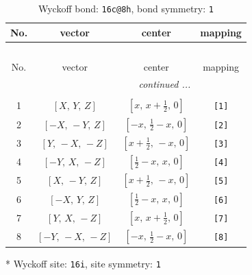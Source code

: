 \documentclass[fleqn,8pt]{jsarticle}
\begin{document}
\renewcommand{\arraystretch}{1.2}
\begin{longtable}{cccc}
\caption{Wyckoff bond: {\tt 16c@8h}, bond symmetry: {\tt 1}}
 \\
 \hline \hline
No. & vector & center & mapping \\ \hline \endfirsthead

\multicolumn{3}{l}{\tablename\ \thetable{}} \\
 \hline \hline
No. & vector & center & mapping \\ \hline \endhead

 \hline \hline
\multicolumn{3}{r}{\footnotesize\it continued ...} \\ \endfoot

 \hline \hline
\multicolumn{3}{r}{} \\ \endlastfoot

1 & $\left[ X,\, Y,\, Z \right]$ & $\left[ x,\, x + \frac{1}{2},\, 0 \right]$ & {\tt [1]} \\ \hline
2 & $\left[ - X,\, - Y,\, Z \right]$ & $\left[ - x,\, \frac{1}{2} - x,\, 0 \right]$ & {\tt [2]} \\ \hline
3 & $\left[ Y,\, - X,\, - Z \right]$ & $\left[ x + \frac{1}{2},\, - x,\, 0 \right]$ & {\tt [3]} \\ \hline
4 & $\left[ - Y,\, X,\, - Z \right]$ & $\left[ \frac{1}{2} - x,\, x,\, 0 \right]$ & {\tt [4]} \\ \hline
5 & $\left[ X,\, - Y,\, Z \right]$ & $\left[ x + \frac{1}{2},\, - x,\, 0 \right]$ & {\tt [5]} \\ \hline
6 & $\left[ - X,\, Y,\, Z \right]$ & $\left[ \frac{1}{2} - x,\, x,\, 0 \right]$ & {\tt [6]} \\ \hline
7 & $\left[ Y,\, X,\, - Z \right]$ & $\left[ x,\, x + \frac{1}{2},\, 0 \right]$ & {\tt [7]} \\ \hline
8 & $\left[ - Y,\, - X,\, - Z \right]$ & $\left[ - x,\, \frac{1}{2} - x,\, 0 \right]$ & {\tt [8]} \\
\end{longtable}
* Wyckoff site: {\tt 16i}, site symmetry: {\tt 1}
\renewcommand{\arraystretch}{1.2}
\end{document}

